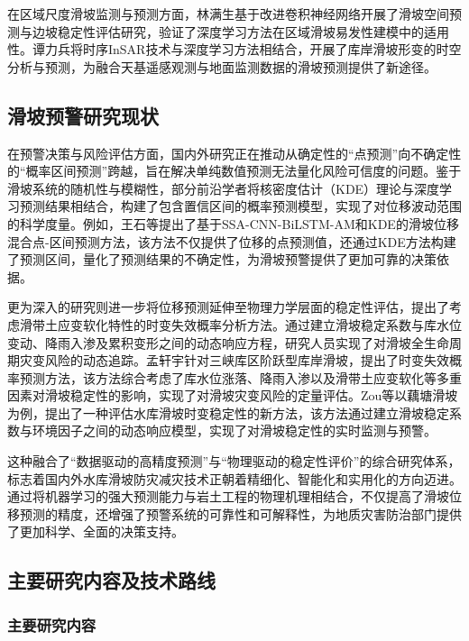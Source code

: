 \documentclass[12pt,a4paper]{article}
\begin{document}
在区域尺度滑坡监测与预测方面，林满生\cite{lin2025improved}基于改进卷积神经网络开展了滑坡空间预测与边坡稳定性评估研究，验证了深度学习方法在区域滑坡易发性建模中的适用性。谭力兵\cite{tan2025insar}将时序InSAR技术与深度学习方法相结合，开展了库岸滑坡形变的时空分析与预测，为融合天基遥感观测与地面监测数据的滑坡预测提供了新途径。



\subsection{滑坡预警研究现状}

在预警决策与风险评估方面，国内外研究正在推动从确定性的“点预测”向不确定性的“概率区间预测”跨越，旨在解决单纯数值预测无法量化风险可信度的问题。鉴于滑坡系统的随机性与模糊性，部分前沿学者将核密度估计（KDE）理论与深度学习预测结果相结合，构建了包含置信区间的概率预测模型，实现了对位移波动范围的科学度量。例如，王石等\cite{wang2025ssa}提出了基于SSA-CNN-BiLSTM-AM和KDE的滑坡位移混合点-区间预测方法，该方法不仅提供了位移的点预测值，还通过KDE方法构建了预测区间，量化了预测结果的不确定性，为滑坡预警提供了更加可靠的决策依据。

更为深入的研究则进一步将位移预测延伸至物理力学层面的稳定性评估，提出了考虑滑带土应变软化特性的时变失效概率分析方法。通过建立滑坡稳定系数与库水位变动、降雨入渗及累积变形之间的动态响应方程，研究人员实现了对滑坡全生命周期灾变风险的动态追踪。孟轩宇\cite{meng2024time}针对三峡库区阶跃型库岸滑坡，提出了时变失效概率预测方法，该方法综合考虑了库水位涨落、降雨入渗以及滑带土应变软化等多重因素对滑坡稳定性的影响，实现了对滑坡灾变风险的定量评估。Zou等\cite{zou2023novel}以藕塘滑坡为例，提出了一种评估水库滑坡时变稳定性的新方法，该方法通过建立滑坡稳定系数与环境因子之间的动态响应模型，实现了对滑坡稳定性的实时监测与预警。

这种融合了“数据驱动的高精度预测”与“物理驱动的稳定性评价”的综合研究体系，标志着国内外水库滑坡防灾减灾技术正朝着精细化、智能化和实用化的方向迈进。通过将机器学习的强大预测能力与岩土工程的物理机理相结合，不仅提高了滑坡位移预测的精度，还增强了预警系统的可靠性和可解释性，为地质灾害防治部门提供了更加科学、全面的决策支持。




\subsection{主要研究内容及技术路线}

\subsubsection{主要研究内容}
\end{document}
